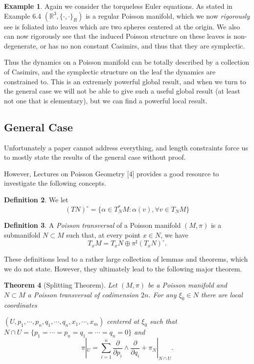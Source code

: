 \documentclass[psamsfonts,12pt]{amsart}
\newcommand\0{\mathbf{0}}
\theoremstyle{plain}
\newtheorem{thm}{Theorem}[section] %
\theoremstyle{definition}
\newtheorem{dfn}[thm]{Definition} %
\newtheorem{ex}[thm]{Example} %
\newcommand{\bbR}{\mathbb{R}}
\begin{document}
\begin{ex}
Again we consider the torqueless Euler equations.  As stated in Example 6.4 $(\bbR^3,\{\cdot,\cdot\}_R)$ is a regular Poisson manifold, which we now \textit{rigorously} see is foliated into leaves which are two spheres centered at the origin.  We also can now rigorously see that the induced Poisson structure on these leaves is non-degenerate, or has no non constant Casimirs, and thus that they are symplectic.
\end{ex}

Thus the dynamics on a Poisson manifold can be totally described by a collection of Casimirs, and the symplectic structure on the leaf the dynamics are constrained to.  This is an extremely powerful global result, and when we turn to the general case we will not be able to give such a useful global result (at least not one that is elementary), but we can find a powerful local result.


\subsection{General Case}

Unfortunately a paper cannot address everything, and length constraints force us to mostly state the results of the general case without proof.

However, Lectures on Poisson Geometry [4] provides a good resource to investigate the following concepts.

\begin{dfn}
We let
\[
(TN)^\circ=\{\alpha \in T^*_N M \colon \alpha(v), \forall v\in T_NM\}
\]
\end{dfn}

\begin{dfn}
A \textit{Poisson transversal} of a Poisson manifold $(M,\pi)$ is a submanifold $N\subset M$ such that, at every point $x\in N$, we have 
\[
T_x M=T_x N \oplus \pi^\sharp(T_x N)^\circ.
\]
\end{dfn}

These definitions lead to a rather large collection of lemmas and theorems, which we do not state.  However, they ultimately lead to the following major theorem.

\begin{thm}[Splitting Theorem]
Let $(M,\pi)$ be a Poisson manifold and $N\subset M$ a Poisson transversal of codimension $2n$.  For any $\xi_0\in N$ there are local coordinates 

$(U,p_1,\cdots, p_n,q_1,\cdots, q_n, x_1,\cdots, x_m)$ centered at $\xi_0$ such that $N\cap U=\{p_1=\cdots =p_n=q_1=\cdots=q_n=0\}$ and 
\[
\pi |_U=\sum_{i=1}^{n}\frac{\partial}{\partial p_i}\wedge \frac{\partial}{\partial q_i}+\pi_N |_{N\cap U}.
\]
\end{thm}
\end{document}
